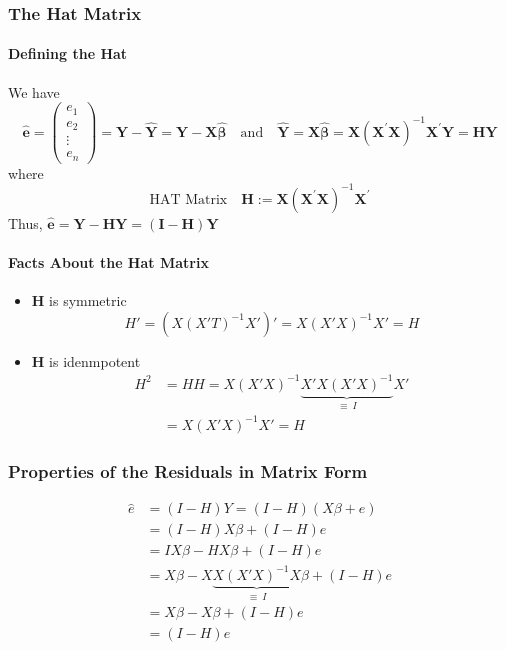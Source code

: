 \documentclass[11pt]{article}
\begin{document}
\subsubsection{The Hat Matrix}
\paragraph{Defining the Hat}
We have
\begin{equation*}
    \widehat{\mathbf{e}}=\left(\begin{array}{c}{e_{1}} \\ {e_{2}} \\ {\vdots} \\ {e_{n}}\end{array}\right)=\mathbf{Y}-\widehat{\mathbf{Y}}=\mathbf{Y}-\mathbf{X} \widehat{\boldsymbol{\beta}} \quad \text{and} \quad  \widehat{\mathbf{Y}}=\mathbf{X} \widehat{\boldsymbol{\beta}}=\mathbf{X}\left(\mathbf{X}^{\prime} \mathbf{X}\right)^{-1} \mathbf{X}^{\prime} \mathbf{Y}=\mathbf{H} \mathbf{Y}
\end{equation*}
where
\begin{equation*}
    \text{HAT Matrix} \quad \mathbf{H} := \mathbf{X}\left(\mathbf{X}^{\prime} \mathbf{X}\right)^{-1} \mathbf{X}^{\prime}
\end{equation*}
Thus, $\widehat{\mathbf{e}}=\mathbf{Y}-\mathbf{H Y}=(\mathbf{I}-\mathbf{H}) \mathbf{Y}$
\paragraph{Facts About the Hat Matrix}
\begin{itemize}
    \item $\mathbf{H}$ is symmetric
        \begin{equation*}
            H' = (X(X'T)^{-1}X')' = X(X'X)^{-1}X' = H
        \end{equation*}
    \item $\mathbf{H}$ is idenmpotent
        \begin{align*}
            H^2 &= HH =  X(X'X)^{-1} \underbrace{X' X(X'X)^{-1}}_{\equiv ~I}X' \\
            &=  X(X'X)^{-1}X' = H
        \end{align*}
\end{itemize}

\subsubsection{Properties of the Residuals in Matrix Form}
\begin{align*}
    \hat{e} &= (I - H)Y = (I - H)(X\beta + e) \\
    &= (I - H)X\beta + (I - H)e \\
    &= IX\beta - HX\beta + (I - H)e \\
    &= X\beta - X\underbrace{X(X'X)^{-1}X}_{\equiv ~I} \beta + (I - H)e \\
    &= X\beta - X\beta + (I - H)e \\
    &= (I - H)e
\end{align*}
\end{document}
